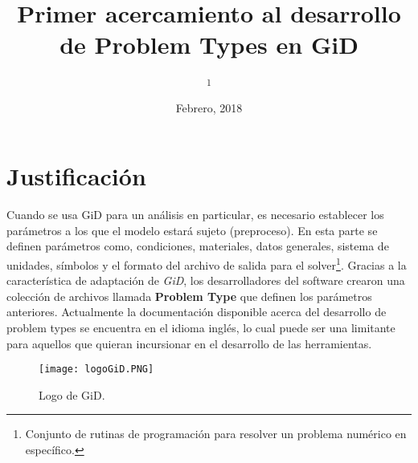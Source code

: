 \documentclass[10pt, a4paper, twocolumn]{article} %
\title{Primer acercamiento al desarrollo de Problem Types en GiD} %
\author{
	\authorstyle{Luis G. Yáñez Rodríguez\textsuperscript{1}} %
	\newline\newline %
	\textsuperscript{1}\institution{Universidad de Guanajuato, Guanajuato, México}\\ %
}
\date{Febrero, 2018} %
\begin{document}
\maketitle %

\thispagestyle{firstpage} %



\section{Justificación}

Cuando se usa GiD para un análisis en particular, es necesario establecer los parámetros a los que el modelo estará sujeto (preproceso). En esta parte se definen parámetros como, condiciones, materiales, datos generales, sistema de unidades, símbolos y el formato del archivo de salida para el solver\footnote{Conjunto de rutinas de programación para resolver un problema numérico en específico.}. Gracias a la característica de adaptación de \textit{GiD}, los desarrolladores del software crearon una colección de archivos llamada \textbf{Problem Type} que definen los parámetros anteriores. Actualmente la documentación disponible acerca del desarrollo de problem types se encuentra en el idioma inglés, lo cual puede ser una limitante para aquellos que quieran incursionar en el desarrollo de las herramientas. 

\begin{figure}[hbt!]\centering
	\texttt{[image: logoGiD.PNG]}
	\caption{Logo de GiD.}
\end{figure}
\end{document}
